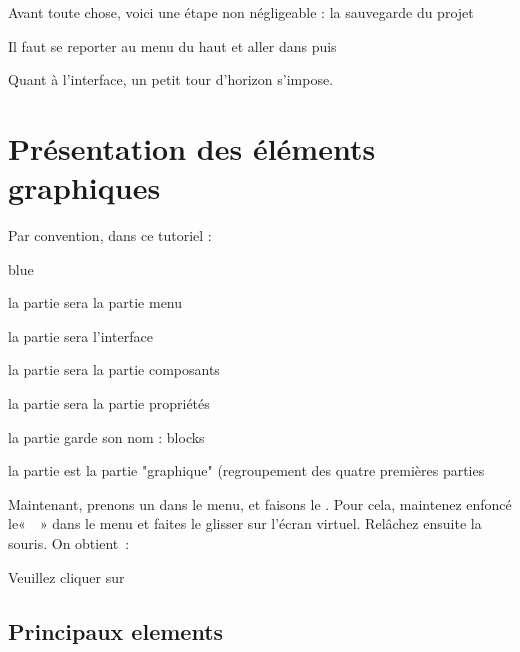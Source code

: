 Avant toute chose, voici une étape non négligeable : la sauvegarde du projet



Il faut se reporter au menu du haut et aller dans  puis 



Quant à l'interface, un petit tour d'horizon s'impose.

\section{Présentation des éléments graphiques}

Par convention, dans ce tutoriel :

\begin{items}{blue}{\Triangle}
    \item la partie  sera la partie menu
    \item la partie   sera l'interface
    \item la partie   sera la partie composants
    \item la partie   sera la partie propriétés
    \item la partie   garde son nom : blocks
    \item la partie  est la partie "graphique" (regroupement des quatre premières parties
\end{items}

Maintenant, prenons un  dans le menu, et faisons le . 
Pour cela, maintenez enfoncé le«  » dans le menu et faites le glisser sur l'écran virtuel. Relâchez ensuite la souris. On obtient :


Veuillez cliquer sur 


\subsection{Principaux elements} \label{menu}

